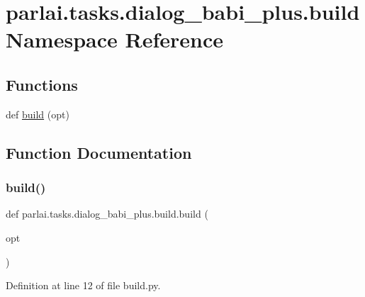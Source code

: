 \hypertarget{namespaceparlai_1_1tasks_1_1dialog__babi__plus_1_1build}{}\section{parlai.\+tasks.\+dialog\+\_\+babi\+\_\+plus.\+build Namespace Reference}
\label{namespaceparlai_1_1tasks_1_1dialog__babi__plus_1_1build}
\subsection*{Functions}
\begin{DoxyCompactItemize}
\item 
def \hyperlink{namespaceparlai_1_1tasks_1_1dialog__babi__plus_1_1build_a744abaf2c667658a3bc25beae9477b94}{build} (opt)
\end{DoxyCompactItemize}


\subsection{Function Documentation}
\mbox{\label{namespaceparlai_1_1tasks_1_1dialog__babi__plus_1_1build_a744abaf2c667658a3bc25beae9477b94}} 
\subsubsection{\texorpdfstring{build()}{build()}}
{\footnotesize\ttfamily def parlai.\+tasks.\+dialog\+\_\+babi\+\_\+plus.\+build.\+build (\begin{DoxyParamCaption}\item[{}]{opt }\end{DoxyParamCaption})}



Definition at line 12 of file build.\+py.


